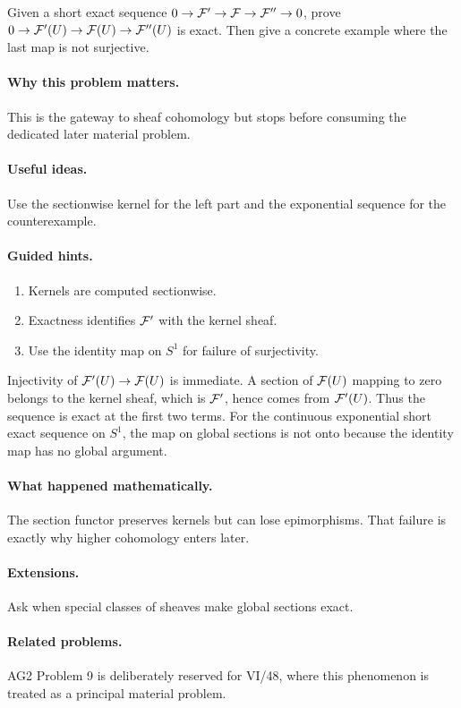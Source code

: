 \begin{problem}\label{prob:vi16-p06}
Given a short exact sequence $0\to\mathcal F'\to\mathcal F\to\mathcal F''\to0$, prove $0\to\mathcal F'(U)\to\mathcal F(U)\to\mathcal F''(U)$ is exact.  Then give a concrete example where the last map is not surjective.
\end{problem}

\ifdefined\FullProblemDossiers
\paragraph{Why this problem matters.}
This is the gateway to sheaf cohomology but stops before consuming the dedicated later material problem.

\paragraph{Useful ideas.}
Use the sectionwise kernel for the left part and the exponential sequence for the counterexample.

\paragraph{Guided hints.}
\begin{enumerate}
\item Kernels are computed sectionwise.
\item Exactness identifies $\mathcal F'$ with the kernel sheaf.
\item Use the identity map on $S^1$ for failure of surjectivity.
\end{enumerate}

\begin{solution}
Injectivity of $\mathcal F'(U)\to\mathcal F(U)$ is immediate.  A section of $\mathcal F(U)$ mapping to zero belongs to the kernel sheaf, which is $\mathcal F'$, hence comes from $\mathcal F'(U)$.  Thus the sequence is exact at the first two terms.  For the continuous exponential short exact sequence on $S^1$, the map on global sections is not onto because the identity map has no global argument.
\end{solution}

\paragraph{What happened mathematically.}
The section functor preserves kernels but can lose epimorphisms.  That failure is exactly why higher cohomology enters later.

\paragraph{Extensions.}
Ask when special classes of sheaves make global sections exact.

\paragraph{Related problems.}
AG2 Problem 9 is deliberately reserved for VI/48, where this phenomenon is treated as a principal material problem.
\fi
